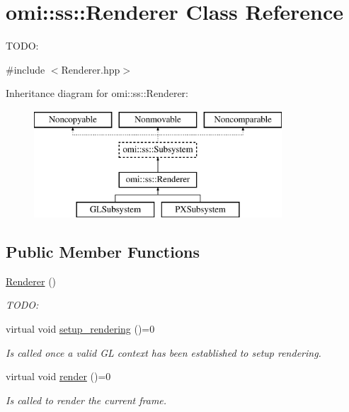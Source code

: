 \hypertarget{classomi_1_1ss_1_1_renderer}{}\section{omi\+:\+:ss\+:\+:Renderer Class Reference}
\label{classomi_1_1ss_1_1_renderer}


T\+O\+DO\+:  




{\ttfamily \#include $<$Renderer.\+hpp$>$}

Inheritance diagram for omi\+:\+:ss\+:\+:Renderer\+:\begin{figure}[H]
\begin{center}
\leavevmode
\includegraphics[height=4.000000cm]{classomi_1_1ss_1_1_renderer}
\end{center}
\end{figure}
\subsection*{Public Member Functions}
\begin{DoxyCompactItemize}
\item 
\hyperlink{classomi_1_1ss_1_1_renderer_a5cd4e0d91112f0507fa340a93f073d95}{Renderer} ()\hypertarget{classomi_1_1ss_1_1_renderer_a5cd4e0d91112f0507fa340a93f073d95}{}\label{classomi_1_1ss_1_1_renderer_a5cd4e0d91112f0507fa340a93f073d95}

\begin{DoxyCompactList}\small\item\em T\+O\+DO\+: \end{DoxyCompactList}\item 
virtual void \hyperlink{classomi_1_1ss_1_1_renderer_a5ab593d16b387b8b32c8ff315aef0abf}{setup\+\_\+rendering} ()=0\hypertarget{classomi_1_1ss_1_1_renderer_a5ab593d16b387b8b32c8ff315aef0abf}{}\label{classomi_1_1ss_1_1_renderer_a5ab593d16b387b8b32c8ff315aef0abf}

\begin{DoxyCompactList}\small\item\em Is called once a valid GL context has been established to setup rendering. \end{DoxyCompactList}\item 
virtual void \hyperlink{classomi_1_1ss_1_1_renderer_ac5a19a0f94dbcf4ac165be1fd555c3a7}{render} ()=0\hypertarget{classomi_1_1ss_1_1_renderer_ac5a19a0f94dbcf4ac165be1fd555c3a7}{}\label{classomi_1_1ss_1_1_renderer_ac5a19a0f94dbcf4ac165be1fd555c3a7}

\begin{DoxyCompactList}\small\item\em Is called to render the current frame. \end{DoxyCompactList}\end{DoxyCompactItemize}
